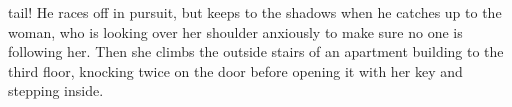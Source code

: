 tail! He races off in pursuit, but keeps to the shadows when he catches up to the woman, who is looking over her shoulder anxiously to make sure no one is following her. Then she climbs the outside stairs of an apartment building to the third floor, knocking twice on the door before opening it with her key and stepping inside.\\

